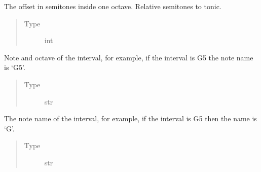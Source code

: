 \documentclass[letterpaper,10pt,english]{sphinxmanual}
\begin{document}
\begin{fulllineitems}
\begin{fulllineitems}
\begin{quote}
\begin{description}
\end{description}\end{quote}

\end{fulllineitems}


\begin{fulllineitems}
\label{\detokenize{birdears:birdears.interval.Interval.chromatic_offset}}
The offset in semitones inside one octave.
Relative semitones to tonic.
\begin{quote}\begin{description}
\item[{Type}] \leavevmode
int

\end{description}\end{quote}

\end{fulllineitems}


\begin{fulllineitems}
\label{\detokenize{birdears:birdears.interval.Interval.note_and_octave}}
Note and octave of the interval, for example, if
the interval is G5 the note name is ‘G5’.
\begin{quote}\begin{description}
\item[{Type}] \leavevmode
str

\end{description}\end{quote}

\end{fulllineitems}


\begin{fulllineitems}
\label{\detokenize{birdears:birdears.interval.Interval.note_name}}
The note name of the interval, for example, if the
interval is G5 then the name is ‘G’.
\begin{quote}\begin{description}
\item[{Type}] \leavevmode
str


\end{description}
\end{quote}
\end{fulllineitems}
\end{fulllineitems}
\end{document}
